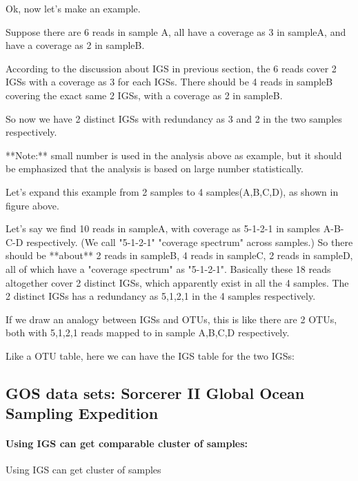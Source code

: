 \documentclass{article}
\begin{document}
Ok, now let's make an example. 

Suppose there are 6 reads in sample A, all have a coverage as 3 in sampleA, and have a coverage as 2 in sampleB.

According to the discussion about IGS in previous section, the 6 reads cover 2 IGSs with a coverage as 3 for each IGSs. There should be 4 reads in sampleB covering the exact same 2 IGSs, with a coverage as 2 in sampleB.

So now we have 2 distinct IGSs with redundancy as 3 and 2 in the two samples respectively. 

**Note:** small number is used in the analysis above as example, but it should be emphasized that the analysis is based on large number statistically.


Let's expand this example from 2 samples to 4 samples(A,B,C,D), as shown in figure above.

Let's say we find 10 reads in sampleA, with coverage as 5-1-2-1 in samples A-B-C-D respectively. (We call "5-1-2-1" "coverage  spectrum" across samples.) So there should be **about** 2 reads in sampleB, 4 reads in sampleC, 2 reads in sampleD, all of which have a "coverage spectrum" as "5-1-2-1". Basically these 18 reads altogether cover 2 distinct IGSs, which apparently exist in all the 4 samples. The 2 distinct IGSs has a redundancy as 5,1,2,1 in the 4 samples respectively.

If we draw an analogy between IGSs and OTUs, this is like there are 2 OTUs, both with 5,1,2,1 reads mapped to in sample A,B,C,D respectively.

Like a OTU table, here we can have the IGS table for the two IGSs:
%
%    
    
    
    
\subsection{GOS data sets: Sorcerer II Global Ocean Sampling Expedition}

\paragraph{Using IGS can get comparable cluster of samples:}

Using IGS can get cluster of samples
\end{document}
